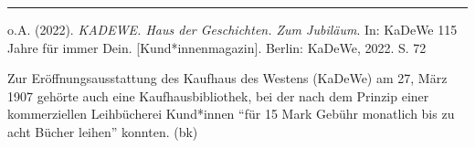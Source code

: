 \documentclass[a4paper,
fontsize=11pt,
oneside,
numbers=noperiodatend,
parskip=half-,
bibliography=totoc,
final
]{scrartcl}
\begin{document}
\begin{center}\rule{0.5\linewidth}{0.5pt}\end{center}

o.A. (2022). \emph{KADEWE. Haus der Geschichten. Zum Jubiläum}. In:
KaDeWe 115 Jahre für immer Dein. {[}Kund*innenmagazin{]}. Berlin:
KaDeWe, 2022. S. 72

Zur Eröffnungsausstattung des Kaufhaus des Westens (KaDeWe) am 27, März
1907 gehörte auch eine Kaufhausbibliothek, bei der nach dem Prinzip
einer kommerziellen Leihbücherei Kund*innen \enquote{für 15 Mark Gebühr
monatlich bis zu acht Bücher leihen} konnten. (bk)

\end{document}
